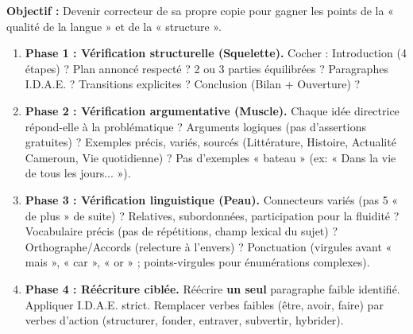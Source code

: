 \documentclass[11pt]{article}
\newcommand{\cle}[1]{{\popxbold\color{popdark}#1}}
\begin{document}
\begin{methode}
\textbf{Objectif :} Devenir correcteur de sa propre copie pour gagner les points de la « qualité de la langue » et de la « structure ».
\begin{enumerate}
    \item \textbf{Phase 1 : Vérification structurelle (Squelette).} Cocher : Introduction (4 étapes) ? Plan annoncé respecté ? 2 ou 3 parties équilibrées ? Paragraphes I.D.A.E. ? Transitions explicites ? Conclusion (Bilan + Ouverture) ?
    \item \textbf{Phase 2 : Vérification argumentative (Muscle).} Chaque idée directrice répond-elle à la problématique ? Arguments logiques (pas d'assertions gratuites) ? Exemples \cle{précis, variés, sourcés} (Littérature, Histoire, Actualité Cameroun, Vie quotidienne) ? Pas d'exemples « bateau » (ex: « Dans la vie de tous les jours... »).
    \item \textbf{Phase 3 : Vérification linguistique (Peau).} \cle{Connecteurs} variés (pas 5 « de plus » de suite) ? \cle{Relatives, subordonnées, participation} pour la fluidité ? \cle{Vocabulaire précis} (pas de répétitions, champ lexical du sujet) ? \cle{Orthographe/Accords} (relecture à l'envers) ? \cle{Ponctuation} (virgules avant « mais », « car », « or » ; points-virgules pour énumérations complexes).
    \item \textbf{Phase 4 : Réécriture ciblée.} Réécrire \textbf{un seul} paragraphe faible identifié. Appliquer I.D.A.E. strict. Remplacer verbes faibles (être, avoir, faire) par verbes d'action (structurer, fonder, entraver, subvertir, hybrider).
\end{enumerate}
\end{methode}
\end{document}
